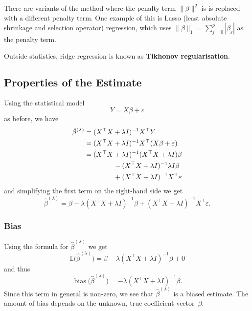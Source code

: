 \documentclass[
  a4paper,
]{article}
\theoremstyle{definition}
\theoremstyle{definition}
\theoremstyle{definition}
\theoremstyle{definition}
\theoremstyle{remark}
\begin{document}
There are variants of the method where the penalty term \(\|\beta\|^2\) is is
replaced with a different penalty term. One example of this is Lasso (least
absolute shrinkage and selection operator) regression, which uses \(\|\beta\|_1
= \sum_{j=0}^p |\beta_j|\) as the penalty term.

Outside statistics, ridge regression is known as \textbf{Tikhonov regularisation}.

\subsection{Properties of the Estimate}\label{properties-of-the-estimate}

Using the statistical model
\begin{equation*}
  Y = X \beta + \varepsilon
\end{equation*}
as before, we have
\begin{align*}
  \hat\beta^{(\lambda)}
  &= (X^\top X + \lambda I)^{-1} X^\top Y \\
  &= (X^\top X + \lambda I)^{-1} X^\top (X \beta + \varepsilon) \\
  &= (X^\top X + \lambda I)^{-1} (X^\top X + \lambda I) \beta \\
    &\hskip15mm - (X^\top X + \lambda I)^{-1} \lambda I \beta \\
    &\hskip15mm + (X^\top X + \lambda I)^{-1} X^\top \varepsilon
\end{align*}
and simplifying the first term on the right-hand side we get
\begin{equation}
  \hat\beta^{(\lambda)}
  = \beta
    - \lambda (X^\top X + \lambda I)^{-1} \beta
    + (X^\top X + \lambda I)^{-1} X^\top \varepsilon.   \label{eq:ridge-def}
\end{equation}

\subsubsection{Bias}\label{bias}

Using the formula for \(\hat\beta^{(\lambda)}\) we get
\begin{equation*}
  \mathbb{E}\bigl( \hat\beta^{(\lambda)} \bigr)
  = \beta - \lambda (X^\top X + \lambda I)^{-1} \beta + 0
\end{equation*}
and thus
\begin{equation*}
  \mathop{\mathrm{bias}}\bigl( \hat\beta^{(\lambda)} \bigr)
  = - \lambda (X^\top X + \lambda I)^{-1} \beta.
\end{equation*}
Since this term in general is non-zero, we see that \(\hat\beta^{(\lambda)}\)
is a biased estimate. The amount of bias depends on the unknown, true
coefficient vector~\(\beta\).
\end{document}
